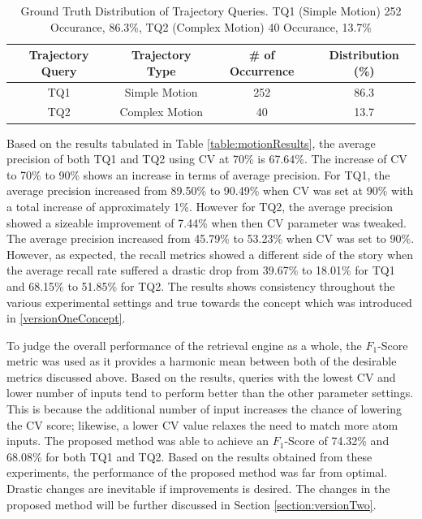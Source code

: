 \begin{table}[bht!]
\centering
  \caption{Ground Truth Distribution of Trajectory Queries. TQ1 (Simple Motion)
  252 Occurance, 86.3\%, TQ2 (Complex Motion) 40 Occurance, 13.7\%}
\label{table:motiondist}
\begin{tabular}{cccc}
\toprule
Trajectory Query &  Trajectory Type & \# of Occurrence & Distribution (\%)   \\
\midrule
TQ1       & Simple Motion       & 252 & 86.3   \\
TQ2      & Complex Motion       & 40 & 13.7  \\
\bottomrule
\end{tabular}
\end{table}

Based on the results tabulated in Table \ref{table:motionResults}, the average
precision of both TQ1 and TQ2 using CV at 70\% is 67.64\%. The increase of CV
to 70\% to 90\% shows an increase in terms of average precision. For TQ1, the
average precision increased from 89.50\% to 90.49\% when CV was set at 90\%
with a total increase of approximately 1\%. However for TQ2, the average
precision showed a sizeable improvement of 7.44\% when then CV parameter was
tweaked. The average precision increased from 45.79\% to 53.23\% when CV was
set to 90\%.
However, as expected, the recall metrics showed a different side of the story
when the average recall rate suffered a drastic drop from 39.67\% to 18.01\%
for TQ1 and 68.15\% to 51.85\% for TQ2. The results shows consistency
throughout the various experimental settings and true towards the concept which
was introduced in \ref{versionOneConcept}.

To judge the overall performance of the retrieval engine as a whole, the $F_1$-Score metric was used as it provides a harmonic mean between both of the
desirable metrics discussed above. Based on the results, queries with the lowest
CV and lower number of inputs tend to perform better than the other parameter
settings.
This is because the additional number of input increases the chance of lowering
the CV score; likewise, a lower CV value relaxes the need to match more atom
inputs.
The proposed method was able to achieve an $F_1$-Score of 74.32\% and 68.08\%
for both TQ1 and TQ2.
Based on the results obtained from these experiments, the performance of the
proposed method was far from optimal. Drastic changes are inevitable if
improvements is desired. The changes in the proposed method will be further
discussed in Section \ref{section:versionTwo}.



